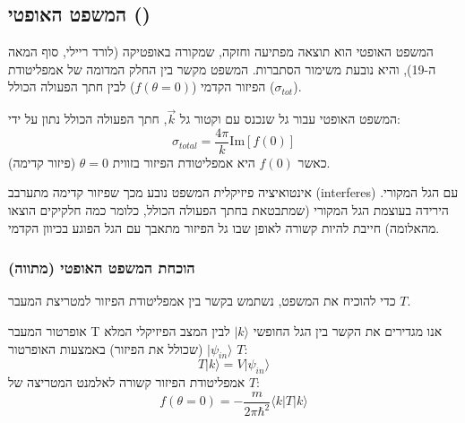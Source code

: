 \subsection{המשפט האופטי ()}

המשפט האופטי הוא תוצאה מפתיעה וחזקה, שמקורה באופטיקה (לורד ריילי, סוף המאה ה-19), והיא נובעת משימור הסתברות. המשפט מקשר בין החלק המדומה של אמפליטודת הפיזור הקדמי ($f(\theta=0)$) לבין חתך הפעולה הכולל ($\sigma_{tot}$).

\begin{theorembox}{המשפט האופטי}
עבור גל שנכנס עם וקטור גל $\vec{k}$, חתך הפעולה הכולל נתון על ידי:
\[
\sigma_{total} = \frac{4\pi}{k} \text{Im}[f(0)]
\]
כאשר $f(0)$ היא אמפליטודת הפיזור בזווית $\theta=0$ (פיזור קדימה).
\end{theorembox}

\begin{notebox}{אינטואיציה פיזיקלית}
המשפט נובע מכך שפיזור קדימה מתערבב (interferes) עם הגל המקורי. הירידה בעוצמת הגל המקורי (שמתבטאת בחתך הפעולה הכולל, כלומר כמה חלקיקים הוצאו מהאלומה) חייבת להיות קשורה לאופן שבו גל הפיזור מתאבך עם הגל הפוגע בכיוון הקדמי.
\end{notebox}

\subsubsection{הוכחת המשפט האופטי (מתווה)}

כדי להוכיח את המשפט, נשתמש בקשר בין אמפליטודת הפיזור למטריצת המעבר $T$.

\begin{definitionbox}{אופרטור המעבר T}
אנו מגדירים את הקשר בין הגל החופשי $|k\rangle$ לבין המצב הפיזיקלי המלא $|\psi_{in}\rangle$ (שכולל את הפיזור) באמצעות האופרטור $T$:
\[
T|k\rangle = V|\psi_{in}\rangle
\]
אמפליטודת הפיזור קשורה לאלמנט המטריצה של $T$:
\[
f(\theta=0) = -\frac{m}{2\pi \hbar^2} \langle k | T | k \rangle
\]
\end{definitionbox}

